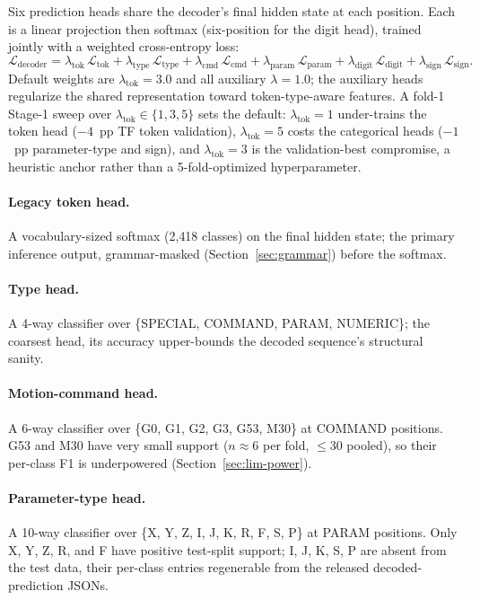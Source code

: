 \documentclass[sensors,article,submit,moreauthors,pdftex]{Definitions/mdpi}
\begin{document}
Six prediction heads share the decoder's final hidden state at each position. Each is a linear projection then softmax (six-position for the digit head), trained jointly with a weighted cross-entropy loss:
\begin{equation*}
\mathcal{L}_{\text{decoder}} =
    \lambda_{\text{tok}}\,\mathcal{L}_{\text{tok}} +
    \lambda_{\text{type}}\,\mathcal{L}_{\text{type}} +
    \lambda_{\text{cmd}}\,\mathcal{L}_{\text{cmd}} +
    \lambda_{\text{param}}\,\mathcal{L}_{\text{param}} +
    \lambda_{\text{digit}}\,\mathcal{L}_{\text{digit}} +
    \lambda_{\text{sign}}\,\mathcal{L}_{\text{sign}}.
\end{equation*}
Default weights are $\lambda_{\text{tok}}=3.0$ and all auxiliary $\lambda=1.0$; the auxiliary heads regularize the shared representation toward token-type-aware features. A fold-1 Stage-1 sweep over $\lambda_{\text{tok}}\!\in\!\{1, 3, 5\}$ sets the default: $\lambda_{\text{tok}}=1$ under-trains the token head ($-4$~pp TF token validation), $\lambda_{\text{tok}}=5$ costs the categorical heads ($-1$~pp parameter-type and sign), and $\lambda_{\text{tok}}=3$ is the validation-best compromise, a heuristic anchor rather than a 5-fold-optimized hyperparameter.

\paragraph{Legacy token head.} A vocabulary-sized softmax (2{,}418 classes) on the final hidden state; the primary inference output, grammar-masked (Section~\ref{sec:grammar}) before the softmax.

\paragraph{Type head.} A 4-way classifier over \{SPECIAL, COMMAND, PARAM, NUMERIC\}; the coarsest head, its accuracy upper-bounds the decoded sequence's structural sanity.

\paragraph{Motion-command head.} A 6-way classifier over \{G0, G1, G2, G3, G53, M30\} at COMMAND positions. G53 and M30 have very small support ($n\!\approx\!6$ per fold, $\le\!30$ pooled), so their per-class F1 is underpowered (Section~\ref{sec:lim-power}).

\paragraph{Parameter-type head.} A 10-way classifier over \{X, Y, Z, I, J, K, R, F, S, P\} at PARAM positions. Only X, Y, Z, R, and F have positive test-split support; I, J, K, S, P are absent from the test data, their per-class entries regenerable from the released decoded-prediction JSONs.
\end{document}
